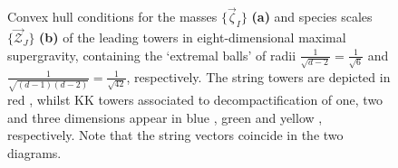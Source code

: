 \begin{figure}
	\begin{center}
            \quad
			\caption{\small Convex hull conditions for the masses $\{\vec{\zeta}_I\}$ \textbf{(a)} and species scales $\{\vec{\mathcal{Z}}_J\}$ \textbf{(b)} of the leading towers in eight-dimensional maximal supergravity, containing the `extremal balls' of radii $\frac{1}{\sqrt{d-2}}=\frac{1}{\sqrt{6}}$ and $\frac{1}{\sqrt{(d-1)(d-2)}}=\frac{1}{\sqrt{42}}$, respectively. The string towers are depicted in red , whilst KK towers associated to decompactification of one, two and three dimensions appear in blue , green  and yellow , respectively. Note that the string vectors coincide in the two diagrams.}\label{fig:convexhulls8d}
	\end{center}
\end{figure}

